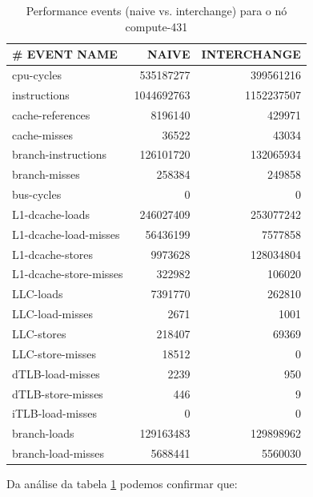 \documentclass[conference,compsoc]{IEEEtran}
\begin{document}
\begin{table}[H]
\caption{Performance events (naive vs. interchange) para o nó compute-431}
\label{table:search_events}
\centering
\begin{tabular}{ | l | r | r |   }

\hline
\# EVENT NAME	 & NAIVE  & INTERCHANGE \\ \hline 
cpu-cycles  & 535187277  & 399561216         \\ \hline       
instructions &       1044692763 &      1152237507      \\ \hline
cache-references &      8196140 &    429971      \\ \hline
cache-misses     &    36522 &     43034      \\ \hline
branch-instructions & 126101720 & 132065934      \\ \hline
branch-misses     &   258384 &  249858      \\ \hline
bus-cycles       &       0 &    0      \\ \hline
L1-dcache-loads  &  246027409 & 253077242     \\ \hline
L1-dcache-load-misses & 56436199 & 7577858   \\ \hline
L1-dcache-stores   &  9973628 & 128034804     \\ \hline
L1-dcache-store-misses & 322982 &  106020     \\ \hline
LLC-loads           &    7391770 & 262810     \\ \hline
LLC-load-misses      &  2671 &  1001     \\ \hline
LLC-stores          &  218407 & 69369     \\ \hline
LLC-store-misses    &   18512 &    0     \\ \hline
dTLB-load-misses    &   2239 & 950     \\ \hline
dTLB-store-misses   &    446 &  9     \\ \hline
iTLB-load-misses   &   0 &   0     \\ \hline
branch-loads   & 129163483 & 129898962  \\ \hline    
branch-load-misses &  5688441 & 5560030      \\ \hline
\end{tabular}
\end{table}


Da análise da tabela   \ref{table:search_events} podemos confirmar que:
\end{document}
